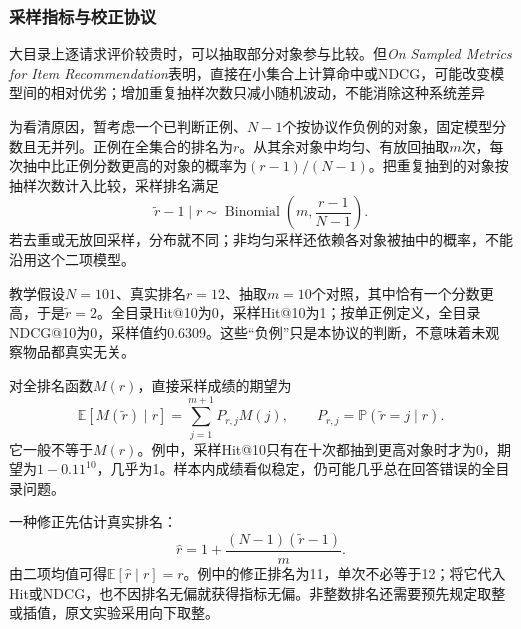 \Needspace{110mm}
\subsubsection{采样指标与校正协议}
\label{sec:rs-evaluation-sampled}

大目录上逐请求评价较贵时，可以抽取部分对象参与比较。但\emph{On Sampled Metrics for Item Recommendation}表明，直接在小集合上计算命中或NDCG，可能改变模型间的相对优劣；增加重复抽样次数只减小随机波动，不能消除这种系统差异

为看清原因，暂考虑一个已判断正例、$N-1$个按协议作负例的对象，固定模型分数且无并列。正例在全集合的排名为$r$。从其余对象中均匀、有放回抽取$m$次，每次抽中比正例分数更高的对象的概率为$(r-1)/(N-1)$。把重复抽到的对象按抽样次数计入比较，采样排名满足
\begin{equation}
  \widetilde r-1\mid r
    \sim\operatorname{Binomial}
       \left(m,\frac{r-1}{N-1}\right).
  \label{eq:rs-evaluation-sampled-rank}
\end{equation}
若去重或无放回采样，分布就不同；非均匀采样还依赖各对象被抽中的概率，不能沿用这个二项模型。

教学假设$N=101$、真实排名$r=12$、抽取$m=10$个对照，其中恰有一个分数更高，于是$\widetilde r=2$。全目录Hit@10为0，采样Hit@10为1；按单正例定义，全目录NDCG@10为0，采样值约0.6309。这些“负例”只是本协议的判断，不意味着未观察物品都真实无关。

对全排名函数$M(r)$，直接采样成绩的期望为
\begin{equation}
  \mathbb E[M(\widetilde r)\mid r]
    =\sum_{j=1}^{m+1}P_{r,j}M(j),
  \qquad P_{r,j}=\mathbb P(\widetilde r=j\mid r).
  \label{eq:rs-evaluation-sampled-expectation}
\end{equation}
它一般不等于$M(r)$。例中，采样Hit@10只有在十次都抽到更高对象时才为0，期望为$1-0.11^{10}$，几乎为1。样本内成绩看似稳定，仍可能几乎总在回答错误的全目录问题。

一种修正先估计真实排名：
\begin{equation}
  \widehat r
    =1+\frac{(N-1)(\widetilde r-1)}{m}.
  \label{eq:rs-evaluation-rank-correction}
\end{equation}
由二项均值可得$\mathbb E[\widehat r\mid r]=r$。例中的修正排名为11，单次不必等于12；将它代入Hit或NDCG，也不因排名无偏就获得指标无偏。非整数排名还需要预先规定取整或插值，原文实验采用向下取整。


